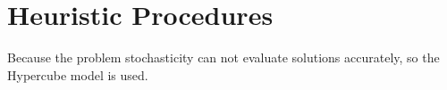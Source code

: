 \chapter{Heuristic Procedures}
Because the problem stochasticity
can not evaluate solutions accurately,
so the Hypercube model is used.




